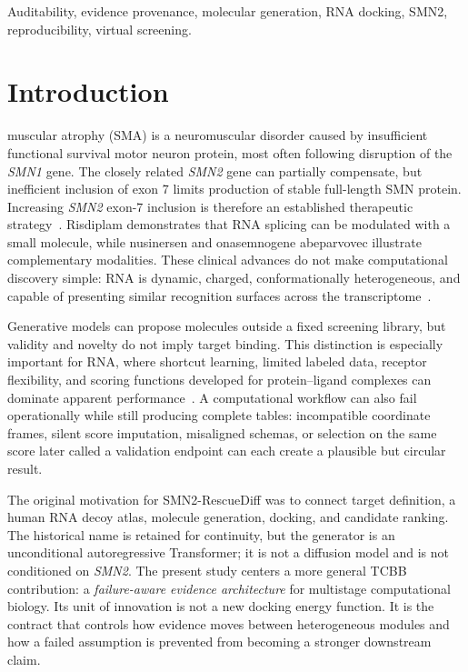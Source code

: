 \documentclass[journal]{IEEEtran}
\begin{document}
\begin{IEEEkeywords}
Auditability, evidence provenance, molecular generation, RNA docking,
SMN2, reproducibility, virtual screening.
\end{IEEEkeywords}

\section{Introduction}
 muscular atrophy (SMA) is a neuromuscular
disorder caused by insufficient functional survival motor neuron
protein, most often following disruption of the \textit{SMN1} gene.
The closely related \textit{SMN2} gene can partially compensate, but
inefficient inclusion of exon 7 limits production of stable full-length
SMN protein. Increasing \textit{SMN2} exon-7 inclusion is therefore an
established therapeutic strategy~\cite{aslesh2022,chong2021}. Risdiplam
demonstrates that RNA splicing can be modulated with a small molecule,
while nusinersen and onasemnogene abeparvovec illustrate complementary
modalities. These clinical advances do not make computational discovery
simple: RNA is dynamic, charged, conformationally heterogeneous, and
capable of presenting similar recognition surfaces across the
transcriptome~\cite{warner2018,childs2022,haga2023}.

Generative models can propose molecules outside a fixed screening
library, but validity and novelty do not imply target binding. This
distinction is especially important for RNA, where shortcut learning,
limited labeled data, receptor flexibility, and scoring functions
developed for protein--ligand complexes can dominate apparent
performance~\cite{wen2026,agarwal2023,gunasinghe2024}. A computational
workflow can also fail operationally while still producing complete
tables: incompatible coordinate frames, silent score imputation,
misaligned schemas, or selection on the same score later called a
validation endpoint can each create a plausible but circular result.

The original motivation for SMN2-RescueDiff was to connect target
definition, a human RNA decoy atlas, molecule generation, docking, and
candidate ranking. The historical name is retained for continuity, but
the generator is an unconditional autoregressive Transformer; it is not
a diffusion model and is not conditioned on \textit{SMN2}. The present
study centers a more general TCBB contribution: a \emph{failure-aware
evidence architecture} for multistage computational biology. Its unit
of innovation is not a new docking energy function. It is the contract
that controls how evidence moves between heterogeneous modules and how
a failed assumption is prevented from becoming a stronger downstream
claim.
\end{document}

